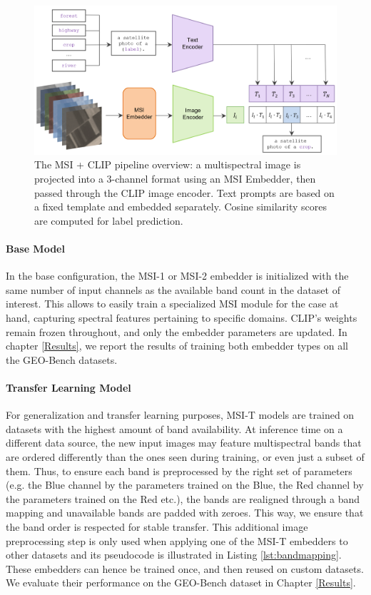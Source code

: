 \documentclass[a4paper, twoside, english]{sapthesis} %
\begin{document}
\begin{figure}[h]
\centering
\includegraphics[width=\textwidth]{img/msi_clip_pipeline.png}
\caption{\normalsize The MSI + CLIP pipeline overview: a multispectral image is projected into a 3-channel format using an MSI Embedder, then passed through the CLIP image encoder. Text prompts are based on a fixed template and embedded separately. Cosine similarity scores are computed for label prediction.}
\label{fig:model_pipeline}
\end{figure}

\paragraph{Base Model} In the base configuration, the MSI-1 or MSI-2 embedder is initialized with the same number of input channels as the available band count in the dataset of interest. This allows to easily train a specialized MSI module for the case at hand, capturing spectral features pertaining to specific domains. CLIP’s weights remain frozen throughout, and only the embedder parameters are updated. In chapter \ref{Results}, we report the results of training both embedder types on all the GEO-Bench datasets.

\paragraph{Transfer Learning Model} For generalization and transfer learning purposes, MSI-T models are trained on datasets with the highest amount of band availability. At inference time on a different data source, the new input images may feature multispectral bands that are ordered differently than the ones seen during training, or even just a subset of them. Thus, to ensure each band is preprocessed by the right set of parameters (e.g. the Blue channel by the parameters trained on the Blue, the Red channel by the parameters trained on the Red etc.), the bands are realigned through a band mapping and unavailable bands are padded with zeroes. This way, we ensure that the band order is respected for stable transfer. This additional image preprocessing step is only used when applying one of the MSI-T embedders to other datasets and its pseudocode is illustrated in Listing \ref{lst:bandmapping}. These embedders can hence be trained once, and then reused on custom datasets. We evaluate their performance on the GEO-Bench dataset in Chapter \ref{Results}.
\end{document}
